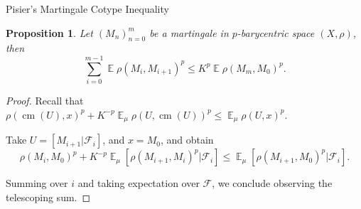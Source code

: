 \documentclass[compress]{beamer}
\DeclareMathOperator{\cm}{cm}
\DeclareMathOperator*{\Avg}{\mathbb{E}}
\newtheorem{proposition}{Proposition}
\begin{document}
\begin{frame}{Pisier's Martingale Cotype Inequality}

\onslide<+->
\begin{proposition}
Let $(M_n)_{n=0}^m$ be a martingale in $p$-barycentric space $(X,\rho)$, then
\[ \sum_{i=0}^{m-1} \Avg \rho(M_i, M_{i+1})^p \le K^p \Avg \rho(M_m,M_0)^p .\]
\end{proposition}
\onslide<+->
\begin{proof}
Recall that \(
 \rho(\cm(U),x)^p+ K^{-p} \Avg_\mu \rho(U,\cm(U))^p \le \Avg_\mu\rho(U,x)^p.
\)

Take $U=[M_{i+1}|\mathcal F_i]$, and $x=M_0$, and obtain
\[ \rho(M_i,M_0)^p+ K^{-p} \Avg_\mu [\rho(M_{i+1},M_i)^p|\mathcal F_i] \le \Avg_\mu[\rho(M_{i+1},M_0)^p|\mathcal F_i]. \]

Summing over $i$ and taking expectation over $\mathcal F$, we conclude observing the telescoping sum.
\end{proof}
\end{frame}
\end{document}
